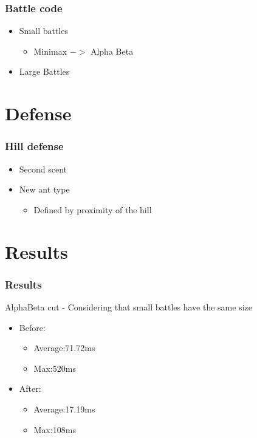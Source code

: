 \documentclass{beamer}
\begin{document}
\begin{frame}
 \frametitle{Battle code}
      \begin{itemize}
 	\item Small battles
	\begin{itemize}
	 \item  Minimax $->$ Alpha Beta
	\end{itemize}
	\item Large Battles
      \end{itemize}

\end{frame}

\section{Defense}
  \begin{frame}
    \frametitle{Hill defense}
    \begin{itemize}
	\item  Second scent
	\item  New ant type
	\begin{itemize}
	 \item Defined by proximity of the hill
	\end{itemize}

    \end{itemize}
      
  \end{frame}
  
  
\section{Results}
  \begin{frame}
    \frametitle{Results}
    AlphaBeta cut - Considering that small battles have the same size
    \begin{itemize}
     \item Before:
     \begin{itemize}
      \item Average:71.72ms
      \item Max:520ms
     \end{itemize}

     \item After:
     \begin{itemize}
      \item Average:17.19ms
      \item Max:108ms
     \end{itemize}

     \end{itemize}
   
  \end{frame}
\end{document}
